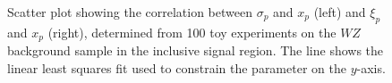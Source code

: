 \begin{figure}[htbp]
    \centering
	\caption{Scatter plot showing the correlation between $\sigma_p$ and $x_p$ (left) and $\xi_p$ and $x_p$ (right), determined from 100 toy experiments on the $WZ$ background sample in the inclusive signal region. The line shows the linear least squares fit used to constrain the parameter on the $y$-axis.}
	\label{fig:resonance-bukin-reduction-WZ}
\end{figure}

